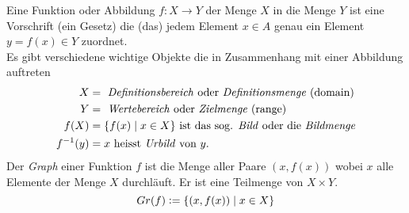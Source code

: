 \begin{definition}{1.9}
Eine Funktion oder Abbildung $f:X\to Y$ der Menge $X$ in die Menge $Y$ ist eine Vorschrift (ein Gesetz) die (das) jedem Element $x\in A$ genau ein Element $y=f(x)\in Y$ zuordnet. \\

Es gibt verschiedene wichtige Objekte die in Zusammenhang mit einer Abbildung auftreten 
\begin{align*}
X &= \text{ \emph{Definitionsbereich} oder \emph{Definitionsmenge} (domain)} \\
Y&= \text{ \emph{Wertebereich} oder \emph{Zielmenge} (range)} \\
f(X) &=\{f(x)\mid x\in X\}\text{ ist das sog. \emph{Bild} oder die \emph{Bildmenge}} \\
f^{-1}(y) &= x\text{ heisst \emph{Urbild} von }y. \end{align*}
Der \emph{Graph} einer Funktion $f$ ist die Menge aller Paare $(x, f(x))$ wobei $x$ alle Elemente der Menge $X$ durchläuft. Er ist eine Teilmenge von $X \times Y$.
\[ Gr(f) \vcentcolon= \{ (x, f(x)) \mid x \in X\} \]
\end{definition}

